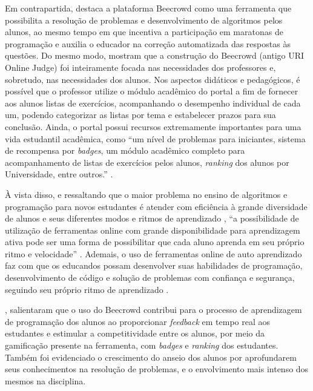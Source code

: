 Em contrapartida, \textcite[p.~5]{cruz2022} destaca a plataforma Beecrowd como uma ferramenta que possibilita a resolução de problemas e desenvolvimento de algoritmos pelos alunos, ao mesmo tempo em que incentiva a participação em maratonas de programação e auxilia o educador na correção automatizada das respostas às questões. Do mesmo modo, \textcite[p.~239]{beztonin2014} mostram que a construção do Beecrowd (antigo URI Online Judge) foi inteiramente focada nas necessidades dos professores e, sobretudo, nas necessidades dos alunos. Nos aspectos didáticos e pedagógicos, é possível que o professor utilize o módulo acadêmico do portal a fim de fornecer aos alunos listas de exercícios, acompanhando o desempenho individual de cada um, podendo categorizar as listas por tema e estabelecer prazos para sua conclusão. Ainda, o portal possui recursos extremamente importantes para uma vida estudantil acadêmica, como “um nível de  problemas  para  iniciantes,  sistema  de  recompensa  por \textit{badges},  um  módulo  acadêmico completo  para  acompanhamento  de  listas  de  exercícios  pelos  alunos,  \textit{ranking}  dos  alunos  por Universidade, entre outros.” \cite[p.~239]{beztonin2014}. 

À vista disso, e ressaltando que o maior problema no ensino de algoritmos e programação para novos estudantes é atender com eficiência à grande diversidade de alunos e seus diferentes modos e ritmos de aprendizado \cite[p.~1]{beztonin2012}, “a possibilidade de utilização de ferramentas online com grande disponibilidade para aprendizagem ativa pode ser uma forma de possibilitar que cada aluno aprenda em seu próprio ritmo e velocidade” \cite[p.~5]{cruz2022}. Ademais, o uso de ferramentas online de auto aprendizado faz com que os educandos possam desenvolver suas habilidades de programação, desenvolvimento de código e solução de problemas com confiança e segurança, seguindo seu próprio ritmo de aprendizado \cite[p.~239-240]{beztonin2014}. 

\textcite[p.~248]{berssanettefrancisco}, salientaram que o uso do Beecrowd contribui para o processo de aprendizagem de programação dos alunos ao proporcionar \textit{feedback} em tempo real aos estudantes e estimular a competitividade entre os alunos, por meio da gamificação presente na ferramenta, com \textit{badges} e \textit{ranking} dos estudantes. Também foi evidenciado o crescimento do anseio dos alunos por aprofundarem seus conhecimentos na resolução de problemas, e o envolvimento mais intenso dos mesmos na disciplina. 

